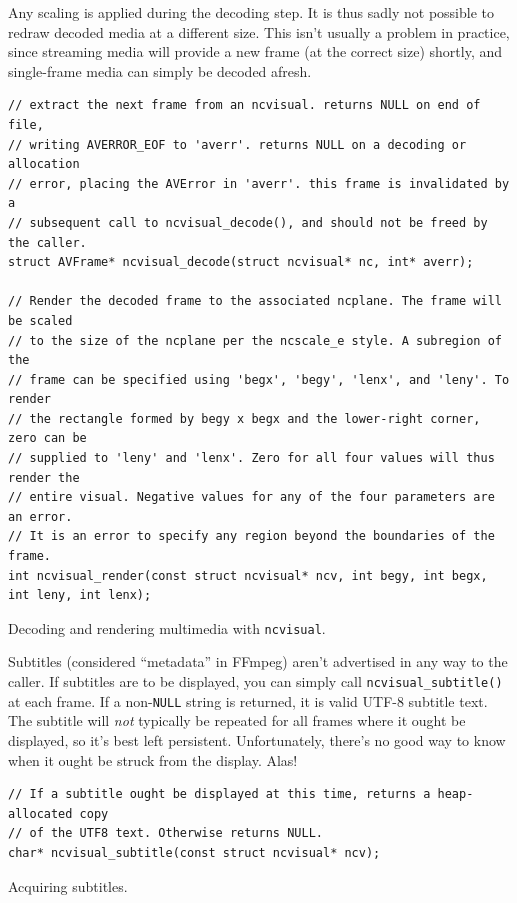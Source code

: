 \documentclass[letterpaper,10pt]{article}
\begin{document}
Any scaling is applied during the decoding step. It is thus sadly not possible
to redraw decoded media at a different size. This isn't usually a problem in
practice, since streaming media will provide a new frame (at the correct size)
shortly, and single-frame media can simply be decoded afresh.

\begin{listing}[!htb]
\begin{verbatim}
// extract the next frame from an ncvisual. returns NULL on end of file,
// writing AVERROR_EOF to 'averr'. returns NULL on a decoding or allocation
// error, placing the AVError in 'averr'. this frame is invalidated by a
// subsequent call to ncvisual_decode(), and should not be freed by the caller.
struct AVFrame* ncvisual_decode(struct ncvisual* nc, int* averr);

// Render the decoded frame to the associated ncplane. The frame will be scaled
// to the size of the ncplane per the ncscale_e style. A subregion of the
// frame can be specified using 'begx', 'begy', 'lenx', and 'leny'. To render
// the rectangle formed by begy x begx and the lower-right corner, zero can be
// supplied to 'leny' and 'lenx'. Zero for all four values will thus render the
// entire visual. Negative values for any of the four parameters are an error.
// It is an error to specify any region beyond the boundaries of the frame.
int ncvisual_render(const struct ncvisual* ncv, int begy, int begx, int leny, int lenx);
\end{verbatim}
\caption{Decoding and rendering multimedia with \texttt{ncvisual}.}
\label{list:multimedia}
\end{listing}

Subtitles (considered ``metadata'' in FFmpeg) aren't advertised in any way to
the caller. If subtitles are to be displayed, you can simply call \texttt{ncvisual\_subtitle()}
at each frame. If a non-\texttt{NULL} string is returned, it is valid UTF-8
subtitle text. The subtitle will \textit{not} typically be repeated for all
frames where it ought be displayed, so it's best left persistent. Unfortunately,
there's no good way to know when it ought be struck from the display. Alas!

\begin{listing}[!htb]
\begin{verbatim}
// If a subtitle ought be displayed at this time, returns a heap-allocated copy
// of the UTF8 text. Otherwise returns NULL.
char* ncvisual_subtitle(const struct ncvisual* ncv);
\end{verbatim}
\caption{Acquiring subtitles.}
\label{list:subtitles}
\end{listing}
\end{document}
